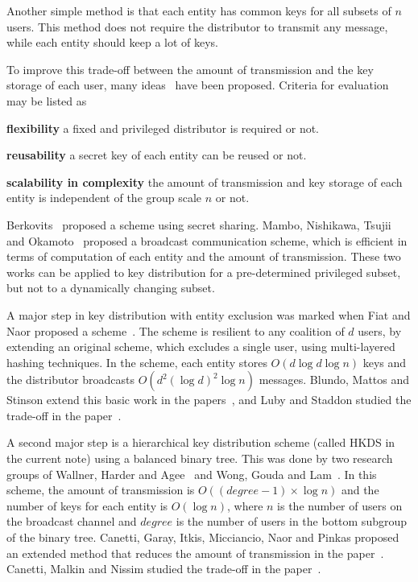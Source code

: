 \documentclass{ims9x6}
\begin{document}
Another simple method is that each entity has common keys for all
subsets of $n$ users. This method does not require the
distributor to transmit any message, while each entity should keep a
lot of keys.

To improve this trade-off between the amount of transmission and the
key storage of each user, many
ideas~\cite{kn:AMM4,kn:B,kn:BMS1,kn:BMS2,kn:CGIM,kn:CMN,kn:FN,kn:LS,kn:MA,kn:MNTO,kn:WHA,kn:WGL}
have been proposed. Criteria for evaluation
may be listed as
\begin{description}
\item {\bf flexibility} a fixed and privileged distributor is required
or not.
\item {\bf reusability} a secret key of each entity can be reused or
not.
\item {\bf scalability in complexity} the amount of transmission and
key storage of each entity is independent of the group scale $n$ or
not.
\end{description}

Berkovits~\cite{kn:B} proposed a scheme using secret sharing. Mambo,
Nishikawa, Tsujii and Okamoto~\cite{kn:MNTO} proposed a broadcast
communication scheme, which is efficient in terms of computation of
each entity and the amount of transmission. These two works can be
applied to key distribution for a pre-determined privileged subset,
but not to a dynamically changing subset.

A major step in key distribution with entity exclusion was marked when
Fiat and Naor proposed a scheme~\cite{kn:FN}. The scheme is resilient
to any coalition of $d$ users, by extending an
original scheme, which
excludes a single user, using multi-layered hashing techniques. In the
scheme, each entity stores $O(d\log d\log n)$ keys and the distributor
broadcasts $O(d^2(\log d)^2\log n)$ messages. Blundo, Mattos and
Stinson extend this basic work in the papers~\cite{kn:BMS1,kn:BMS2},
and Luby and Staddon studied the trade-off in the paper~\cite{kn:LS}.

A second major step is a hierarchical key distribution scheme (called
HKDS in the current note) using a balanced binary tree. This was done
by two research groups of Wallner, Harder and
Agee~\cite{kn:WHA} and Wong, Gouda and Lam~\cite{kn:WGL}. In this
scheme, the amount of transmission is $O((degree-1)\times\log n)$ and
the number of keys for each entity is $O(\log n)$, where $n$ is the
number of users on the broadcast channel and $degree$
is the number of users in the bottom subgroup of the binary
tree. Canetti, Garay, Itkis, Micciancio, Naor and Pinkas proposed an
extended method that reduces the amount of transmission in the
paper~\cite{kn:CGIM}. Canetti, Malkin and Nissim studied the trade-off
in the paper~\cite{kn:CMN}.
\end{document}
